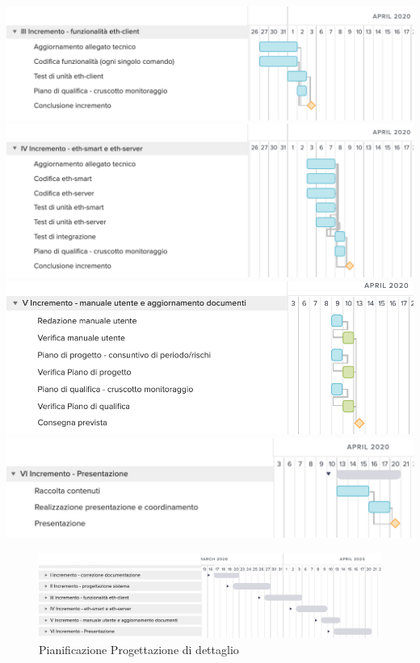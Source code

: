	\includegraphics[width=\textwidth]{res/img/gantt/RQ/3}
	\includegraphics[width=\textwidth]{res/img/gantt/RQ/4}
	\includegraphics[width=\textwidth]{res/img/gantt/RQ/5}	
	\includegraphics[width=\textwidth]{res/img/gantt/RQ/6}
\begin{figure}[h!]
	\includegraphics[width=\textwidth]{res/img/gantt/RQ/f}
	\caption{Pianificazione Progettazione di dettaglio}
\end{figure}
